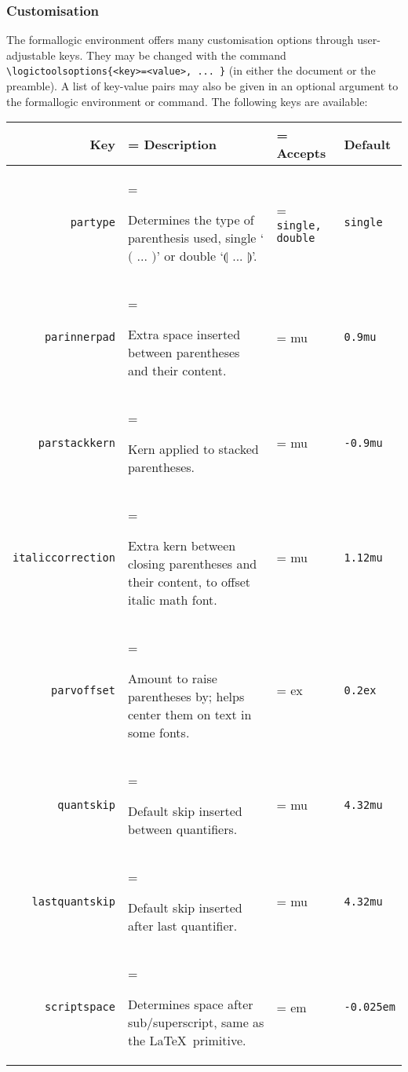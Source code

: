 \documentclass{article}
\begin{document}
\subsubsection{Customisation}
The formallogic environment offers many customisation options through user-adjustable keys. They may be changed with the command \verb|\logictoolsoptions{<key>=<value>, ... }| (in either the document or the preamble). A list of key-value pairs may also be given in an optional argument to the formallogic environment or command. The following keys are available:
\setlength{\tabcolsep}{6pt} %
\renewcommand{\arraystretch}{1.5} %
\begin{center}
\begin{tabularx}{\textwidth}{r|>{\hsize=1.65\hsize\linewidth=\hsize}X
|>{\hsize=0.35\hsize\linewidth=\hsize}X|l|}
   Key  & Description & Accepts & Default \\ \hline
   \texttt{partype} & \raggedright Determines the type of parenthesis used, single `$($ ... $)$' or double `$\llparenthesis$ ... $\rrparenthesis$'. & \texttt{single,} \texttt{double} & \texttt{single} \\
   \texttt{parinnerpad} & \raggedright Extra space inserted between parentheses and their content. & mu & \texttt{0.9mu} \\
   \texttt{parstackkern} & \raggedright Kern applied to stacked parentheses. & mu & \texttt{-0.9mu} \\
   \texttt{italiccorrection} & \raggedright Extra kern between closing parentheses and their content, to offset italic math font. & mu & \texttt{1.12mu} \\
   \texttt{parvoffset} & \raggedright Amount to raise parentheses by; helps center them on text in some fonts. & ex & \texttt{0.2ex} \\
   \texttt{quantskip} & \raggedright Default skip inserted between quantifiers. & mu & \texttt{4.32mu} \\
   \texttt{lastquantskip} & \raggedright Default skip inserted after last quantifier. & mu & \texttt{4.32mu} \\
   \texttt{scriptspace} & \raggedright Determines space after sub/superscript, same as the \LaTeX\ primitive. & em & \texttt{-0.025em} 
\end{tabularx} 
\end{center}
\end{document}

